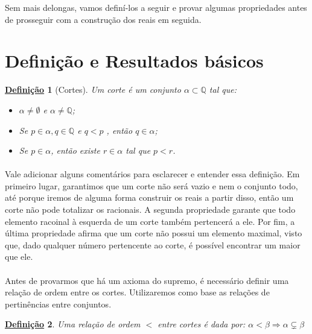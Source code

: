 \documentclass{article}
\newtheorem{definition}{\underline{Defini\c c\~ao}}
\begin{document}
Sem mais delongas, vamos defin\'i-los a seguir e provar algumas propriedades antes de prosseguir com a constru\c c\~ao dos reais em seguida.

\section{Defini\c c\~ao e Resultados b\'asicos}
\begin{definition}[Cortes] 
Um corte \'e um conjunto $\alpha\subset\mathbb{Q}$ tal que:
\begin{itemize}
\item [i)] $\alpha\neq\emptyset$ e $\alpha\neq\mathbb{Q}$;
\item [ii)] Se $p\in\alpha, q\in\mathbb{Q}$ e $q<p$ , ent\~ao $q\in\alpha$;
\item [iii)] Se $p\in\alpha$, ent\~ao existe $r\in\alpha$ tal que $p < r$.
\end{itemize}
\end{definition}

\paragraph{} Vale adicionar alguns coment\'arios para esclarecer e entender essa defini\c c\~ao. Em primeiro lugar, garantimos que um corte n\~ao ser\'a vazio e nem o conjunto todo, at\'e porque iremos de alguma forma construir os reais a partir disso, ent\~ao um corte n\~ao pode totalizar os racionais. A segunda propriedade garante que todo elemento racoinal \`a esquerda de um corte tamb\'em pertencer\'a a ele. Por fim, a \'ultima propriedade afirma que um corte n\~ao possui um elemento maximal, visto que, dado qualquer n\'umero pertencente ao corte, \'e poss\'ivel encontrar um maior que ele.

\paragraph{} Antes de provarmos que h\'a um axioma do supremo, \'e necess\'ario definir uma rela\c c\~ao de ordem entre os cortes. Utilizaremos como base as rela\c c\~oes de pertin\^encias entre conjuntos.

\begin{definition}
Uma rela\c c\~ao de ordem $<$ entre cortes \'e dada por: $\alpha < \beta \Rightarrow \alpha\subsetneq\beta$
\end{definition}
\end{document}
